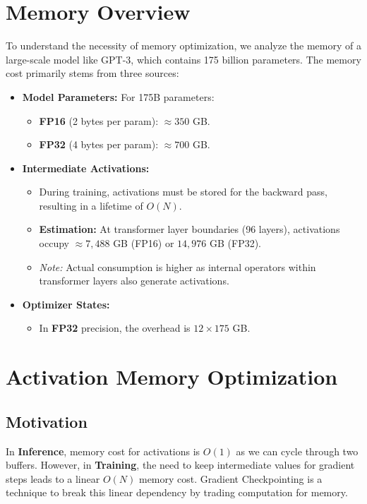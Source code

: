 
\section{Memory Overview}
To understand the necessity of memory optimization, we analyze the memory of a large-scale model like GPT-3, which contains 175 billion parameters. The memory cost primarily stems from three sources:

\begin{itemize}
    \item \textbf{Model Parameters:} For 175B parameters:
    \begin{itemize}
        \item \textbf{FP16} (2 bytes per param): $\approx 350$ GB.
        \item \textbf{FP32} (4 bytes per param): $\approx 700$ GB.
    \end{itemize}
    
    \item \textbf{Intermediate Activations:} 
    \begin{itemize}
        \item During training, activations must be stored for the backward pass, resulting in a lifetime of $O(N)$.
        \item \textbf{Estimation:} At transformer layer boundaries (96 layers), activations occupy $\approx 7,488$ GB (FP16) or $14,976$ GB (FP32). 
        \item \textit{Note:} Actual consumption is higher as internal operators within transformer layers also generate activations.
    \end{itemize}
    
    \item \textbf{Optimizer States:}
    \begin{itemize}
        \item In \textbf{FP32} precision, the overhead is $12 \times 175$ GB.
    \end{itemize}
\end{itemize}

\section{Activation Memory Optimization}

\subsection{Motivation}
In \textbf{Inference}, memory cost for activations is $O(1)$ as we can cycle through two buffers. However, in \textbf{Training}, the need to keep intermediate values for gradient steps leads to a linear $O(N)$ memory cost. Gradient Checkpointing is a technique to break this linear dependency by trading computation for memory.

